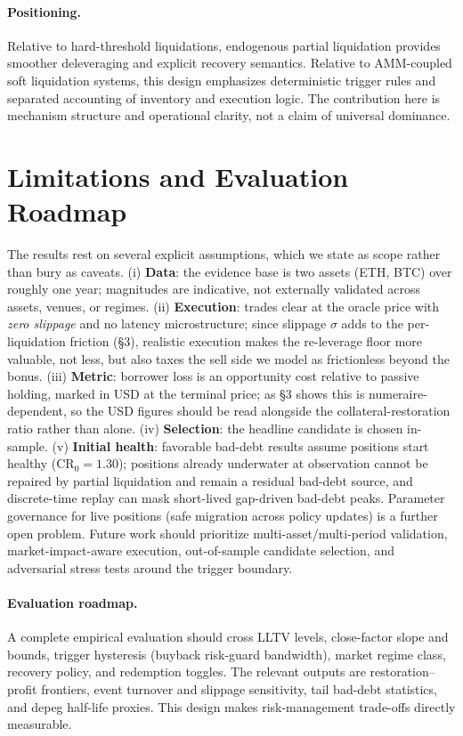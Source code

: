 \documentclass[12pt]{article}
\begin{document}
\paragraph{Positioning.}
Relative to hard-threshold liquidations, endogenous partial liquidation provides smoother deleveraging and explicit recovery semantics. Relative to AMM-coupled soft liquidation systems, this design emphasizes deterministic trigger rules and separated accounting of inventory and execution logic. The contribution here is mechanism structure and operational clarity, not a claim of universal dominance.

\section{Limitations and Evaluation Roadmap}
The results rest on several explicit assumptions, which we state as scope rather than bury as caveats. (i) \textbf{Data}: the evidence base is two assets (ETH, BTC) over roughly one year; magnitudes are indicative, not externally validated across assets, venues, or regimes. (ii) \textbf{Execution}: trades clear at the oracle price with \emph{zero slippage} and no latency microstructure; since slippage $\sigma$ adds to the per-liquidation friction (\S3), realistic execution makes the re-leverage floor more valuable, not less, but also taxes the sell side we model as frictionless beyond the bonus. (iii) \textbf{Metric}: borrower loss is an opportunity cost relative to passive holding, marked in USD at the terminal price; as \S3 shows this is numeraire-dependent, so the USD figures should be read alongside the collateral-restoration ratio rather than alone. (iv) \textbf{Selection}: the headline candidate is chosen in-sample. (v) \textbf{Initial health}: favorable bad-debt results assume positions start healthy ($\mathrm{CR}_0=1.30$); positions already underwater at observation cannot be repaired by partial liquidation and remain a residual bad-debt source, and discrete-time replay can mask short-lived gap-driven bad-debt peaks. Parameter governance for live positions (safe migration across policy updates) is a further open problem. Future work should prioritize multi-asset/multi-period validation, market-impact-aware execution, out-of-sample candidate selection, and adversarial stress tests around the trigger boundary.

\paragraph{Evaluation roadmap.}
A complete empirical evaluation should cross LLTV levels, close-factor slope and bounds, trigger hysteresis (buyback risk-guard bandwidth), market regime class, recovery policy, and redemption toggles. The relevant outputs are restoration--profit frontiers, event turnover and slippage sensitivity, tail bad-debt statistics, and depeg half-life proxies. This design makes risk-management trade-offs directly measurable.
\end{document}
